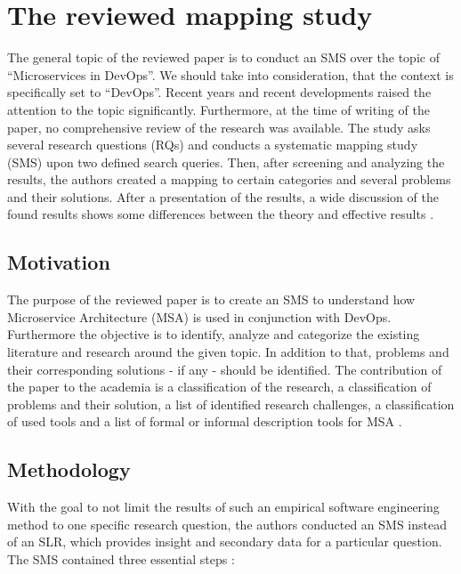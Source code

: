 \section{The reviewed mapping study}
\label{sec:summary}

The general topic of the reviewed paper is to conduct an SMS over the topic
of ``Microservices in DevOps''. We should take into consideration, that the context
is specifically set to ``DevOps''. Recent years and recent developments
raised the attention to the topic significantly. Furthermore, at the
time of writing of the paper, no comprehensive review of the research was
available. The study asks several research questions (RQs) and conducts
a systematic mapping study (SMS) upon two defined search queries. Then,
after screening and analyzing the results, the authors created a mapping
to certain categories and several problems and their solutions.
After a presentation of the results, a wide discussion of the found
results shows some differences between the theory and effective
results \cite{waseem:SMSMSADevOps}.

\subsection{Motivation}

The purpose of the reviewed paper is to create an SMS to understand how 
Microservice Architecture (MSA) is used in conjunction with DevOps.
Furthermore the objective is to identify, analyze and categorize the
existing literature and research around the given topic.
In addition to that, problems and their corresponding solutions - if any - should
be identified. The contribution of the paper to the
academia is a classification of the research, a classification of problems
and their solution, a list of identified research challenges, a classification of
used tools and a list of formal or informal description
tools for MSA \cite{waseem:SMSMSADevOps}.

\subsection{Methodology}

With the goal to not limit the results of such an empirical software engineering method
to one specific research question, the authors conducted an SMS instead of an SLR,
which provides insight and secondary data for a particular question.
The SMS contained three essential steps \cite{waseem:SMSMSADevOps}:

